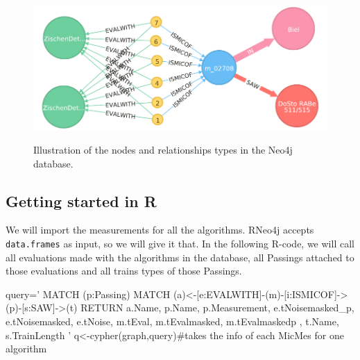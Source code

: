 \documentclass{article}\usepackage[]{graphicx}\usepackage[]{color}
\begin{document}
\begin{figure}
\centering
\includegraphics[width=\textwidth]{img/graph.pdf}
\label{graphneo4j}
\caption{Illustration of the nodes and relationships types in the Neo4j database.}
\label{fig:neo4jdb}
\end{figure}

\subsection{Getting started in R}

We will import the measurements for all the algorithms. RNeo4j accepts {\tt data.frames} as input, so we will give it that. In the following R-code, we will call all evaluations made with the algorithms in the database, all Passings attached to those evaluations and all trains types of those Passings.

\begin{Schunk}
\begin{Sinput}
query='
MATCH (p:Passing) 
MATCH (a)<-[e:EVALWITH]-(m)-[i:ISMICOF]->(p)-[s:SAW]->(t) 
RETURN a.Name, p.Name, p.Measurement, e.tNoisemasked_p, e.tNoisemasked, e.tNoise, m.tEval, m.tEvalmasked, m.tEvalmaskedp , t.Name, s.TrainLength
'
q<-cypher(graph,query)#takes the info of each MicMes for one algorithm
\end{Sinput}
\end{Schunk}
\end{document}
